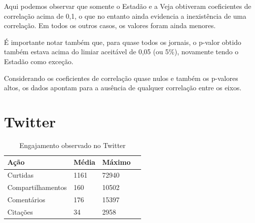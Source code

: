 \documentclass[
	12pt,
	oneside,
	a4paper,
	english,
	brazil
]{abntex2ppgsi}
\begin{document}
Aqui podemos observar que somente o Estadão e a Veja obtiveram coeficientes de correlação acima de 0,1, o que no entanto ainda evidencia a inexistência de uma correlação. Em todos os outros casos, os valores foram ainda menores.

É importante notar também que, para quase todos os jornais, o p-valor obtido também estava acima do limiar aceitável de 0,05 (ou 5\%), novamente tendo o Estadão como exceção.

Considerando os coeficientes de correlação quase nulos e também os p-valores altos, os dados apontam para a ausência de qualquer correlação entre os eixos.

\section{Twitter}

\begin{table}[H]
	\centering
	\caption{Engajamento observado no Twitter}
		\begin{tabular}{p{2in} p{1in} p{1in} p{1in} } \hline

		Ação              & Média & Máximo \\ \hline
		Curtidas	      & 1161  & 72940 \\ 
		Compartilhamentos & 160   & 10502 \\ 
		Comentários       & 176   & 15397 \\
		Citações          & 34    & 2958 \\ \hline
		
		\end{tabular}
	\label{tab:engajamento-twitter}
\end{table}
\end{document}
